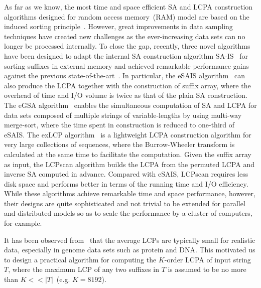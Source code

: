 \documentclass[article]{IEEEtran}
\theoremstyle{definition}
\theoremstyle{remark}
\numberwithin{equation}{section}
\begin{document}
As far as we know, the most time and space efficient SA and LCPA construction algorithms designed for random access memory~(RAM) model are based on the induced sorting principle~\cite{nong2011,Fischer11}. However, great improvements in data sampling techniques have created new challenges as the ever-increasing data sets can no longer be processed internally. To close the gap, recently, three novel algorithms~\cite{Nong15, Bingmann12, Nong14} have been designed to adapt the internal SA construction algorithm SA-IS~\cite{nong2011} for sorting suffixes in external memory and achieved remarkable performance gains against the previous state-of-the-art~\cite{Dementiev08}. In particular, the eSAIS algorithm~\cite{Bingmann12} can also produce the LCPA together with the construction of suffix array, where the overhead of time and I/O volume is twice as that of the plain SA construction. The eGSA algorithm~\cite{Felipe2013} enables the simultaneous computation of SA and LCPA for data sets composed of multiple strings of variable-lengths by using multi-way merge-sort, where the time spent in construction is reduced to one-third of eSAIS. The exLCP algorithm~\cite{Markus2012} is a lightweight LCPA construction algorithm for very large collections of sequences, where the Burrow-Wheeler transform is calculated at the same time to facilitate the computation. Given the suffix array as input, the LCPscan algorithm \cite{Juha2014} builds the LCPA from the permuted LCPA and inverse SA computed in advance. Compared with eSAIS, LCPscan requires less disk space and performs better in terms of the running time and I/O efficiency. While these algorithms achieve remarkable time and space performance, however, their designs are quite sophisticated and not trivial to be extended for parallel and distributed models so as to scale the performance by a cluster of computers, for example.

It has been observed from~\cite{Felipe2013} that the average LCPs are typically small for realistic data, especially in genome data sets such as protein and DNA. This motivated us to design a practical algorithm for computing the $K$-order LCPA of input string $T$, where the maximum LCP of any two suffixes in $T$ is assumed to be no more than $K<<|T|$~(e.g. $K=8192$).
\end{document}
